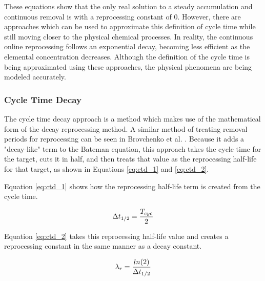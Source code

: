  These equations show that the only real solution to a steady accumulation and continuous removal is with a reprocessing constant of 0. However, there are approaches which can be used to approximate this definition of cycle time while still moving closer to the physical chemical processes. In reality, the continuous online reprocessing follows an exponential decay, becoming less efficient as the elemental concentration decreases. Although the definition of the cycle time is being approximated using these approaches, the physical phenomena are being modeled accurately.

\subsubsection{Cycle Time Decay}
\label{s:CTD}

The cycle time decay approach is a method which makes use of the mathematical form of the decay reprocessing method. A similar method of treating removal periods for reprocessing can be seen in Brovchenko et al. \cite{brovchenko_neutronic_2019}. Because it adds a "decay-like" term to the Bateman equation, this approach takes the cycle time for the target, cuts it in half, and then treats that value as the reprocessing half-life for that target, as shown in  Equations \eqref{eq:ctd_1} and \eqref{eq:ctd_2}.

Equation \eqref{eq:ctd_1} shows how the reprocessing half-life term is created from the cycle time.

\begin{equation} \hfill
\Delta t_{1/2} = \frac{T_{cyc}}{2}
\hfill\label{eq:ctd_1} \end{equation}

Equation \eqref{eq:ctd_2} takes this reprocessing half-life value and creates a reprocessing constant in the same manner as a decay constant.

\begin{equation} \hfill
\lambda_r = \frac{ln(2)}{\Delta t_{1/2}}
\hfill\label{eq:ctd_2} \end{equation}



